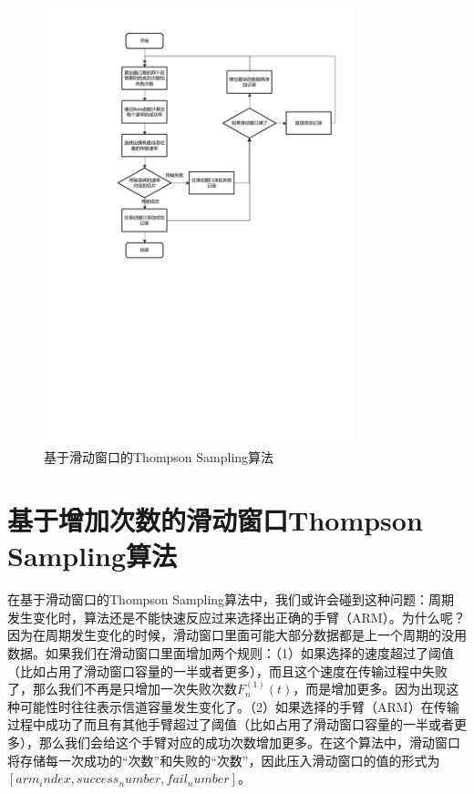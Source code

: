 \begin{figure}[h]
	\centering
	\includegraphics[width=0.8\textwidth]{figure/滑动流程图.pdf}
	\caption{基于滑动窗口的Thompson Sampling算法}
	\label{滑动流程图}
\end{figure}

\section{基于增加次数的滑动窗口Thompson Sampling算法}
在基于滑动窗口的Thompson Sampling算法中，我们或许会碰到这种问题：周期发生变化时，算法还是不能快速反应过来选择出正确的手臂（ARM）。为什么呢？因为在周期发生变化的时候，滑动窗口里面可能大部分数据都是上一个周期的没用数据。如果我们在滑动窗口里面增加两个规则：（1）如果选择的速度超过了阈值（比如占用了滑动窗口容量的一半或者更多），而且这个速度在传输过程中失败了，那么我们不再是只增加一次失败次数$F_{n}^{(1)}(t)$，而是增加更多。因为出现这种可能性时往往表示信道容量发生变化了。（2）如果选择的手臂（ARM）在传输过程中成功了而且有其他手臂超过了阈值（比如占用了滑动窗口容量的一半或者更多），那么我们会给这个手臂对应的成功次数增加更多。在这个算法中，滑动窗口将存储每一次成功的“次数”和失败的“次数”，因此压入滑动窗口的值的形式为$[arm_index, success_number, fail_number]$。

